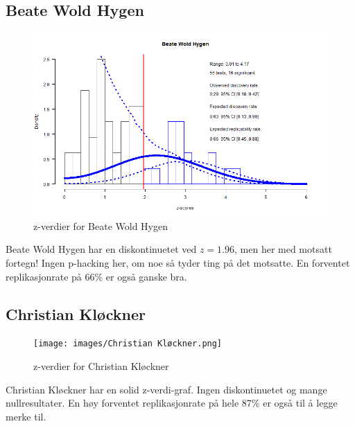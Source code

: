 \documentclass[doc,norsk]{apa7}
\begin{document}
\subsection{Beate Wold Hygen}
\begin{figure}[h!]
    \centering
    \includegraphics[width=\textwidth]{images/Beate Wold Hygen.png}
    \caption{z-verdier for Beate Wold Hygen}
\end{figure}
Beate Wold Hygen har en diskontinuetet ved $z=1.96$, men her med motsatt fortegn! Ingen p-hacking her, om noe så tyder ting på det motsatte. En forventet replikasjonrate på 66\% er også ganske bra.

\subsection{Christian Kløckner}
\begin{figure}[h!]
    \centering
    \texttt{[image: images/Christian Kløckner.png]}
    \caption{z-verdier for Christian Kløckner}
\end{figure}
Christian Kløckner har en solid z-verdi-graf. Ingen diskontinuetet og mange nullresultater. En høy forventet replikasjonrate på hele 87\% er også til å legge merke til.
\end{document}
